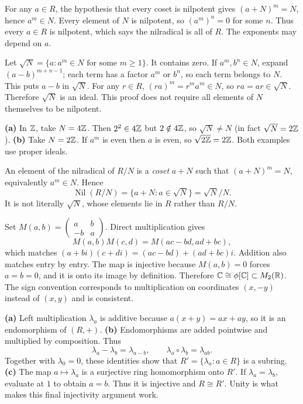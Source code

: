 For any $a\in R$, the hypothesis that every coset is nilpotent gives $(a+N)^m=N$, hence $a^m\in N$. Every element of $N$ is nilpotent, so $(a^m)^n=0$ for some $n$. Thus every $a\in R$ is nilpotent, which says the nilradical is all of $R$. The exponents may depend on $a$.

Let $\sqrt N=\{a:a^m\in N\text{ for some }m\ge1\}$. It contains zero. If $a^m,b^n\in N$, expand $(a-b)^{m+n-1}$; each term has a factor $a^m$ or $b^n$, so each term belongs to $N$. This puts $a-b$ in $\sqrt N$.
For any $r\in R$, $(ra)^m=r^ma^m\in N$, so $ra=ar\in\sqrt N$. Therefore $\sqrt N$ is an ideal. This proof does not require all elements of $N$ themselves to be nilpotent.

\textbf{(a)} In $\mathbb{Z}$, take $N=4\mathbb{Z}$. Then $2^2\in4\mathbb{Z}$ but $2\notin4\mathbb{Z}$, so $\sqrt N\ne N$ (in fact $\sqrt N=2\mathbb{Z}$).
\textbf{(b)} Take $N=2\mathbb{Z}$. If $a^m$ is even then $a$ is even, so $\sqrt{2\mathbb{Z}}=2\mathbb{Z}$. Both examples use proper ideals.

An element of the nilradical of $R/N$ is a \emph{coset} $a+N$ such that $(a+N)^m=N$, equivalently $a^m\in N$. Hence
\[\operatorname{Nil}(R/N)=\{a+N:a\in\sqrt N\}=\sqrt N/N.\]
It is not literally $\sqrt N$, whose elements lie in $R$ rather than $R/N$.

Set $M(a,b)=\begin{pmatrix}a&b\\-b&a\end{pmatrix}$. Direct multiplication gives
\[M(a,b)M(c,d)=M(ac-bd,ad+bc),\]
which matches $(a+bi)(c+di)=(ac-bd)+(ad+bc)i$. Addition also matches entry by entry. The map is injective because $M(a,b)=0$ forces $a=b=0$, and it is onto its image by definition. Therefore $\mathbb{C}\cong\phi[\mathbb{C}]\subset M_2(\mathbb{R})$. The sign convention corresponds to multiplication on coordinates $(x,-y)$ instead of $(x,y)$ and is consistent.

\textbf{(a)} Left multiplication $\lambda_a$ is additive because $a(x+y)=ax+ay$, so it is an endomorphism of $(R,+)$.
\textbf{(b)} Endomorphisms are added pointwise and multiplied by composition. Thus
\[\lambda_a-\lambda_b=\lambda_{a-b},\qquad \lambda_a\circ\lambda_b=\lambda_{ab}.\]
Together with $\lambda_0=0$, these identities show that $R'=\{\lambda_a:a\in R\}$ is a subring.
\textbf{(c)} The map $a\mapsto\lambda_a$ is a surjective ring homomorphism onto $R'$. If $\lambda_a=\lambda_b$, evaluate at $1$ to obtain $a=b$. Thus it is injective and $R\cong R'$. Unity is what makes this final injectivity argument work.
